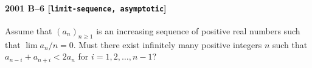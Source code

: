 \paragraph{2001 B--6 \textnormal{[\texttt{limit-sequence, asymptotic}]}}
Assume that $(a_n)_{n\geq 1}$ is an increasing sequence of
positive real numbers such that
$\lim a_n/n=0$. Must there exist infinitely many positive integers
$n$ such that $a_{n-i}+a_{n+i}<2a_n$ for $i=1,2,\ldots,n-1$?
